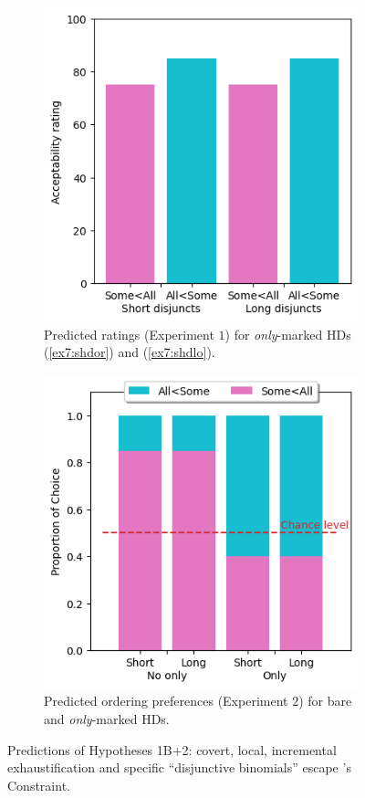\begin{figure}[H]
\begin{subfigure}[t]{.3\linewidth}
		\includegraphics[width=\linewidth]{./images/pred-1b+2-only.png}
		\caption[]{Predicted ratings (Experiment $1$) for \textit{only}-marked HDs (\ref{ex7:shdor}) and (\ref{ex7:shdlo}).}
	\end{subfigure}
	\hfill
	\begin{subfigure}[t]{.3\linewidth}
		\centering
		\includegraphics[width=\linewidth]{./images/pred-1b-pref.png}
		\caption[]{Predicted ordering preferences (Experiment $2$) for bare and \textit{only}-marked HDs.}
	\end{subfigure}
	\caption[]{Predictions of Hypotheses 1B+2: covert, local, incremental exhaustification and specific ``disjunctive binomials'' escape \citeauthor{Hurford1974}'s Constraint.}\label{fig7:predictions-exh-incr-freq}
\end{figure} 



